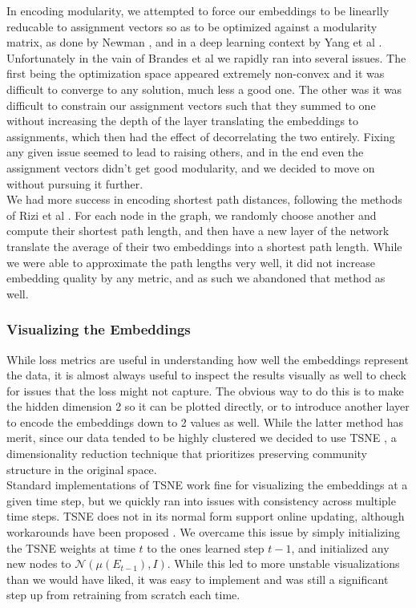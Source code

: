 \documentclass[12pt,twoside]{report}
\begin{document}
In encoding modularity, we attempted to force our embeddings to be linearlly reducable to assignment vectors so as to be optimized against a modularity matrix, as done by Newman \cite{newman2006modularity}, and in a deep learning context by Yang et al \cite{yang2016modularity}. Unfortunately in the vain of Brandes et al \cite{brandes2006maximizing} we rapidly ran into several issues. The first being the optimization space appeared extremely non-convex and it was difficult to converge to any solution, much less a good one. The other was it was difficult to constrain our assignment vectors such that they summed to one without increasing the depth of the layer translating the embeddings to assignments, which then had the effect of decorrelating the two entirely. Fixing any given issue seemed to lead to raising others, and in the end even the assignment vectors didn't get good modularity, and we decided to move on without pursuing it further. \\

We had more success in encoding shortest path distances, following the methods of Rizi et al \cite{rizi2018shortest}. For each node in the graph, we randomly choose another and compute their shortest path length, and then have a new layer of the network translate the average of their two embeddings into a shortest path length. While we were able to approximate the path lengths very well, it did not increase embedding quality by any metric, and as such we abandoned that method as well. \\

\subsubsection{Visualizing the Embeddings}

While loss metrics are useful in understanding how well the embeddings represent the data, it is almost always useful to inspect the results visually as well to check for issues that the loss might not capture. The obvious way to do this is to make the hidden dimension 2 so it can be plotted directly, or to introduce another layer to encode the embeddings down to 2 values as well. While the latter method has merit, since our data tended to be highly clustered we decided to use TSNE \cite{maaten2008visualizing}, a dimensionality reduction technique that prioritizes preserving community structure in the original space. \\

Standard implementations of TSNE work fine for visualizing the embeddings at a given time step, but we quickly ran into issues with consistency across multiple time steps. TSNE does not in its normal form support online updating, although workarounds have been proposed \cite{van2009learning}. We overcame this issue by simply initializing the TSNE weights at time $t$ to the ones learned step $t-1$, and initialized any new nodes to $\mathcal{N}(\mu(E_{t-1}), I)$. While this led to more unstable visualizations than we would have liked, it was easy to implement and was still a significant step up from retraining from scratch each time. \\
\end{document}
